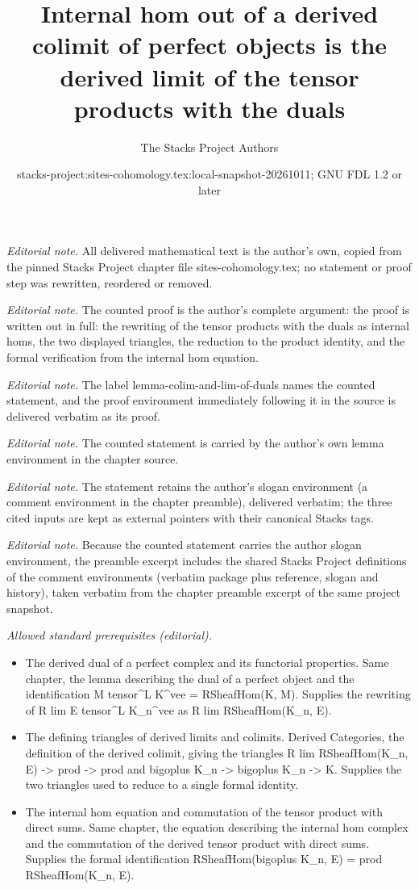\documentclass[10pt,a4paper]{amsart}
\title{Internal hom out of a derived colimit of perfect objects is the derived limit of the tensor products with the duals}
\author{The Stacks Project Authors}
\date{stacks-project:sites-cohomology.tex:local-snapshot-20261011; GNU FDL 1.2 or later}
\theoremstyle{plain}
\theoremstyle{definition}
\theoremstyle{remark}
\numberwithin{equation}{subsection}
\begin{document}
\maketitle
\noindent\textit{Editorial note.} All delivered mathematical text is the author's own, copied from the pinned Stacks Project chapter file sites-cohomology.tex; no statement or proof step was rewritten, reordered or removed.\par\medskip
\noindent\textit{Editorial note.} The counted proof is the author's complete argument: the proof is written out in full: the rewriting of the tensor products with the duals as internal homs, the two displayed triangles, the reduction to the product identity, and the formal verification from the internal hom equation.\par\medskip
\noindent\textit{Editorial note.} The label lemma-colim-and-lim-of-duals names the counted statement, and the proof environment immediately following it in the source is delivered verbatim as its proof.\par\medskip
\noindent\textit{Editorial note.} The counted statement is carried by the author's own lemma environment in the chapter source.\par\medskip
\noindent\textit{Editorial note.} The statement retains the author's slogan environment (a comment environment in the chapter preamble), delivered verbatim; the three cited inputs are kept as external pointers with their canonical Stacks tags.\par\medskip
\noindent\textit{Editorial note.} Because the counted statement carries the author slogan environment, the preamble excerpt includes the shared Stacks Project definitions of the comment environments (verbatim package plus reference, slogan and history), taken verbatim from the chapter preamble excerpt of the same project snapshot.\par\medskip
\noindent\textit{Allowed standard prerequisites (editorial).}\begin{itemize}
\item The derived dual of a perfect complex and its functorial properties. Same chapter, the lemma describing the dual of a perfect object and the identification M tensor\textasciicircum{}L K\textasciicircum{}vee = RSheafHom(K, M). Supplies the rewriting of R lim E tensor\textasciicircum{}L K\_n\textasciicircum{}vee as R lim RSheafHom(K\_n, E).
\item The defining triangles of derived limits and colimits. Derived Categories, the definition of the derived colimit, giving the triangles R lim RSheafHom(K\_n, E) -> prod -> prod and bigoplus K\_n -> bigoplus K\_n -> K. Supplies the two triangles used to reduce to a single formal identity.
\item The internal hom equation and commutation of the tensor product with direct sums. Same chapter, the equation describing the internal hom complex and the commutation of the derived tensor product with direct sums. Supplies the formal identification RSheafHom(bigoplus K\_n, E) = prod RSheafHom(K\_n, E).
\end{itemize}\medskip
\end{document}
